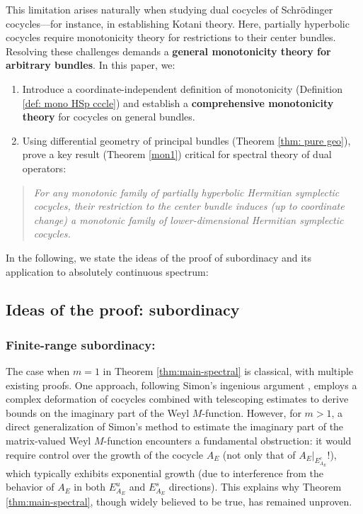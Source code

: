 \documentclass[11pt]{amsart}
\theoremstyle{remark}
\theoremstyle{definition}
\begin{document}
This limitation arises naturally when studying dual cocycles of Schr\"odinger cocycles---for instance, in establishing Kotani theory. Here, partially hyperbolic cocycles require monotonicity theory for restrictions to their center bundles. Resolving these challenges demands a \textbf{general monotonicity theory for arbitrary bundles}. In this paper, we:
\begin{enumerate}
    \item Introduce a coordinate-independent definition of monotonicity (Definition \ref{def: mono HSp cccle}) and establish a \textbf{comprehensive monotonicity theory} for cocycles on general bundles.
    \item Using differential geometry of principal bundles (Theorem \ref{thm: pure geo}), prove a key result (Theorem \ref{mon1}) critical for spectral theory of dual operators:
\end{enumerate}
\begin{quote}
    \textit{For any monotonic family of partially hyperbolic Hermitian symplectic cocycles, their restriction to the center bundle induces (up to coordinate change) a monotonic family of lower-dimensional Hermitian symplectic cocycles.}
\end{quote}



In the following, we state the ideas of the proof of subordinacy and its application to absolutely continuous spectrum: 

\subsection{Ideas of the proof: subordinacy}


\subsubsection{Finite-range subordinacy:}\label{idea1}
The case when $m=1$ in Theorem \ref{thm:main-spectral} is classical, with multiple existing proofs. One approach, following Simon's ingenious argument \cite{Simon}, employs a complex deformation of cocycles combined with telescoping estimates to derive bounds on the imaginary part of the Weyl $M$-function. 
However, for $m>1$, a direct generalization of Simon's method to estimate the imaginary part of the matrix-valued Weyl $M$-function encounters a fundamental obstruction: it would require control over the growth of the cocycle $A_E$ (not only that of $A_E|_{E^c_{A_E}}$!), which typically exhibits exponential growth (due to interference from the behavior of $A_E$ in both $E^u_{A_E}$ and $E^s_{A_E}$ directions). This explains why Theorem \ref{thm:main-spectral}, though widely believed to be true, has remained unproven. 
\end{document}
